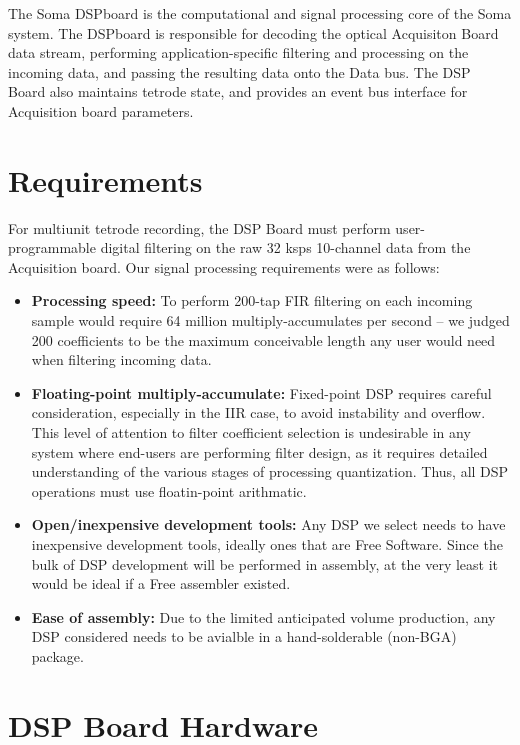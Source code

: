 
The Soma DSPboard is the computational and signal processing core of
the Soma system. The DSPboard is responsible for decoding the optical
Acquisiton Board data stream, performing application-specific
filtering and processing on the incoming data, and passing the
resulting data onto the Data bus. The DSP Board also maintains tetrode
state, and provides an event bus interface for Acquisition board
parameters.

\section{Requirements}
For multiunit tetrode recording, the DSP Board must perform
user-programmable digital filtering on the raw 32 ksps 10-channel data
from the Acquisition board. Our signal processing requirements were as
follows:
    
\begin{itemize}
\item \textbf{Processing speed:} To perform 200-tap FIR filtering on each
  incoming sample would require 64 million multiply-accumulates per
  second -- we judged 200 coefficients to be the maximum conceivable
  length any user would need when filtering incoming data.
  
\item \textbf{Floating-point multiply-accumulate:} Fixed-point DSP requires
  careful consideration, especially in the IIR case, to avoid
  instability and overflow. This level of attention to filter
  coefficient selection is undesirable in any system where end-users
  are performing filter design, as it requires detailed understanding
  of the various stages of processing quantization. Thus, all DSP
  operations must use floatin-point arithmatic.
  
\item \textbf{Open/inexpensive development tools:} Any DSP we select needs to
  have inexpensive development tools, ideally ones that are Free
  Software. Since the bulk of DSP development will be performed in
  assembly, at the very least it would be ideal if a Free assembler
  existed.
  
\item \textbf{Ease of assembly:} Due to the limited anticipated volume
  production, any DSP considered needs to be avialble in a
  hand-solderable (non-BGA) package.
\end{itemize}

\section{DSP Board Hardware}
      
